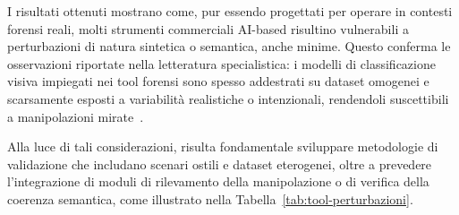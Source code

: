 I risultati ottenuti mostrano come, pur essendo progettati per operare in contesti forensi reali, molti strumenti commerciali AI-based risultino vulnerabili a perturbazioni di natura sintetica o semantica, anche minime. Questo conferma le osservazioni riportate nella letteratura specialistica: i modelli di classificazione visiva impiegati nei tool forensi sono spesso addestrati su dataset omogenei e scarsamente esposti a variabilità realistiche o intenzionali, rendendoli suscettibili a manipolazioni mirate~\cite{phd_unisi_068552, costantini2019digital, VerificationOfAI}.

Alla luce di tali considerazioni, risulta fondamentale sviluppare metodologie di validazione che includano scenari ostili e dataset eterogenei, oltre a prevedere l’integrazione di moduli di rilevamento della manipolazione o di verifica della coerenza semantica, come illustrato nella Tabella~\ref{tab:tool-perturbazioni}.


